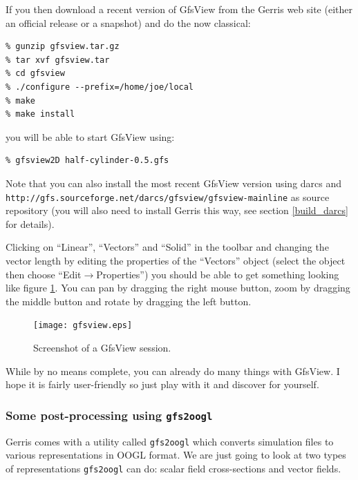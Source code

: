 \documentclass[a4paper]{article}
\begin{document}
If you then download a recent version of GfsView from the Gerris web
site (either an official release or a snapshot) and do the now classical:
\begin{verbatim}
% gunzip gfsview.tar.gz
% tar xvf gfsview.tar
% cd gfsview
% ./configure --prefix=/home/joe/local
% make
% make install
\end{verbatim}
you will be able to start GfsView using:
\begin{verbatim}
% gfsview2D half-cylinder-0.5.gfs
\end{verbatim}
Note that you can also install the most recent GfsView version using
darcs and {\tt http://gfs.sourceforge.net/darcs/gfsview/gfsview-mainline} as source
repository (you will also need to install Gerris this way, see section
\ref{build_darcs} for details).

Clicking on ``Linear'', ``Vectors'' and ``Solid'' in the toolbar and
changing the vector length by editing the properties of the
``Vectors'' object (select the object then choose
``Edit$\rightarrow$Properties'') you should be able to get something
looking like figure \ref{fig:gfsview}. You can pan by dragging the right
mouse button, zoom by dragging the middle button and rotate by
dragging the left button.
\begin{figure}[htbp]
\begin{center}
\texttt{[image: gfsview.eps]}
\end{center}
\caption{Screenshot of a GfsView session.}
\label{fig:gfsview}
\end{figure}

While by no means complete, you can already do many things with
GfsView. I hope it is fairly user-friendly so just play with it and
discover for yourself.

\subsubsection{Some post-processing using {\tt gfs2oogl}}

Gerris comes with a utility called {\tt gfs2oogl} which converts
simulation files to various representations in {\sc OOGL} format. We are
just going to look at two types of representations {\tt gfs2oogl} can
do: scalar field cross-sections and vector fields.
\end{document}
